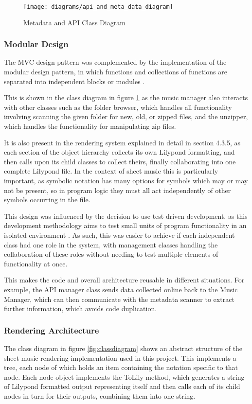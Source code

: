 \begin{figure}[H]
    \centering
    \texttt{[image: diagrams/api\_and\_meta\_data\_diagram]}
    \caption{Metadata and API Class Diagram}
    \label{fig:metadiagram}
\end{figure}

\subsubsection{Modular Design}
The MVC design pattern was complemented by the implementation of the  modular design pattern, in which functions and collections of functions are separated into independent blocks or modules \parencite{modular}.

This is shown in the class diagram in figure \ref{fig:metadiagram} as the music manager also interacts with other classes such as the folder browser, which handles all functionality involving scanning the given folder for new, old, or zipped files, and the unzipper, which handles the functionality for manipulating zip files.

It is also present in the rendering system explained in detail in section 4.3.5, as each section of the object hierarchy collects its own Lilypond formatting, and then calls upon its child classes to collect theirs, finally collaborating into one complete Lilypond file. In the context of sheet music this is particularly important, as symbolic notation has many options for symbols which may or may not be present, so in program logic they must all act independently of other symbols occurring in the file.

This design was influenced by the decision to use test driven development, as this development methodology aims to test small units of program functionality in an isolated environment \parencite{TDD}.
 As such, this was easier to achieve if each independent class had one role in the system, with management classes handling the collaboration of these roles without needing to test multiple elements of functionality at once. 

This makes the code and overall architecture reusable in different situations. For example, the API manager class sends data collected online back to the Music Manager, which can then communicate with the metadata scanner to extract further information, which avoids code duplication.

\subsubsection{Rendering Architecture}
The class diagram in figure \ref{fig:classdiagram} shows an abstract structure of the sheet music rendering implementation used in this project. This implements a tree, each node of which holds an item containing the notation specific to that node. Each node object implements the ToLily method, which generates a string of Lilypond formatted output representing itself and then calls each of its child nodes in turn for their outputs, combining them into one string. 

